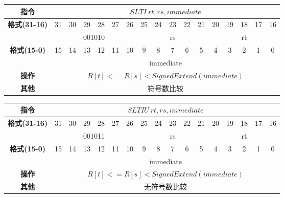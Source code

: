 \documentclass[11pt,utf8]{article}
\begin{document}
\begin{center}
\begin{tabular}{|c|c|c|c|c|c|c|c|c|c|c|c|c|c|c|c|c|}
\hline
\textbf{指令} & \multicolumn{16}{c|}{$SLTI~rt,rs,immediate$} \\
\hline
\multirow{2}{*}{\textbf{格式(31-16)}} & 31 & 30 & 29 & 28 & 27 & 26 & 25 & 24 & 23 & 22 & 21 & 20 & 19 & 18 & 17 & 16 \\ 
\cline{2-17}
& \multicolumn{6}{c|}{001010} & \multicolumn{5}{c|}{rs} & \multicolumn{5}{c|}{rt}\\
\hline
\multirow{2}{*}{\textbf{格式(15-0)}} & 15 & 14 & 13 & 12 & 11 & 10 & 9 & 8 & 7 & 6 & 5 & 4 & 3 & 2 & 1 & 0 \\
\cline{2-17}
& \multicolumn{16}{c|}{immediate} \\
\hline
\textbf{操作} & \multicolumn{16}{c|}{$R[t]<=R[s] < SignedExtend(immediate)$} \\
\hline
\textbf{其他} & \multicolumn{16}{c|}{符号数比较} \\
\hline
\end{tabular}
\end{center}

\begin{center}
\begin{tabular}{|c|c|c|c|c|c|c|c|c|c|c|c|c|c|c|c|c|}
\hline
\textbf{指令} & \multicolumn{16}{c|}{$SLTIU~rt,rs,immediate$} \\
\hline
\multirow{2}{*}{\textbf{格式(31-16)}} & 31 & 30 & 29 & 28 & 27 & 26 & 25 & 24 & 23 & 22 & 21 & 20 & 19 & 18 & 17 & 16 \\ 
\cline{2-17}
& \multicolumn{6}{c|}{001011} & \multicolumn{5}{c|}{rs} & \multicolumn{5}{c|}{rt}\\
\hline
\multirow{2}{*}{\textbf{格式(15-0)}} & 15 & 14 & 13 & 12 & 11 & 10 & 9 & 8 & 7 & 6 & 5 & 4 & 3 & 2 & 1 & 0 \\
\cline{2-17}
& \multicolumn{16}{c|}{immediate} \\
\hline
\textbf{操作} & \multicolumn{16}{c|}{$R[t]<=R[s] < SignedExtend(immediate)$} \\
\hline
\textbf{其他} & \multicolumn{16}{c|}{无符号数比较} \\
\hline
\end{tabular}
\end{center}
\end{document}
